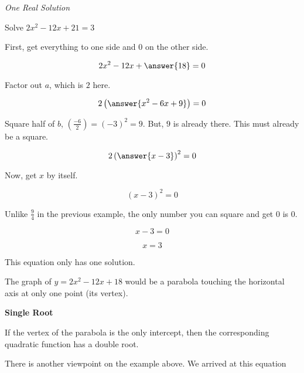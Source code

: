 \documentclass{ximera}
\begin{document}
\begin{example} \textit{One Real Solution}

Solve $2 x^2 - 12x + 21 = 3$ \\

\begin{explanation}


First, get everything to one side and $0$ on the other side.



\[  2 x^2 - 12x + \answer{18} = 0  \]

Factor out $a$, which is $2$ here.

\[  2 \left( \answer{x^2 - 6x + 9} \right) = 0  \]


Square half of $b$, $\left(\frac{-6}{2}\right) = (-3)^2 = 9$.  But, $9$ is already there.  This must already be a square.



\[  2 \left( \answer{x - 3} \right)^2 = 0  \]


Now, get $x$ by itself.

\[  (x - 3)^2 = 0  \]


Unlike $\frac{9}{4}$ in the previous example, the only number you can square and get $0$ is $0$.

\[  x - 3 = 0  \]

\[  x = 3  \]


This equation only has one solution.


\end{explanation}
\end{example}



The graph of $y = 2 x^2 - 12x + 18$ would be a parabola touching the horizontal axis at only one point (its vertex).




\begin{idea} \textbf{\textcolor{red!90!darkgray}{Single Root}}

If the vertex of the parabola is the only intercept, then the corresponding quadratic function has a double root.


\end{idea}



There is another viewpoint on the example above.  We arrived at this equation
\end{document}
